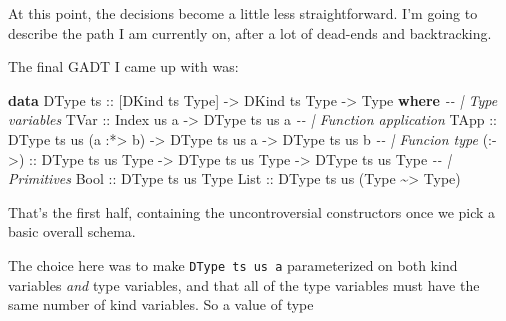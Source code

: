 \documentclass[]{article}
\newenvironment{Shaded}{}{}
\newcommand{\CommentTok}[1]{\textcolor[rgb]{0.38,0.63,0.69}{\textit{#1}}}
\newcommand{\DataTypeTok}[1]{\textcolor[rgb]{0.56,0.13,0.00}{#1}}
\newcommand{\KeywordTok}[1]{\textcolor[rgb]{0.00,0.44,0.13}{\textbf{#1}}}
\newcommand{\NormalTok}[1]{#1}
\newcommand{\OperatorTok}[1]{\textcolor[rgb]{0.40,0.40,0.40}{#1}}
\newcommand{\OtherTok}[1]{\textcolor[rgb]{0.00,0.44,0.13}{#1}}
\begin{document}
At this point, the decisions become a little less straightforward. I'm going to
describe the path I am currently on, after a lot of dead-ends and backtracking.

The final GADT I came up with was:

\begin{Shaded}
\begin{Highlighting}[]
\KeywordTok{data} \DataTypeTok{DType}\OtherTok{ ts ::}\NormalTok{ [}\DataTypeTok{DKind}\NormalTok{ ts }\DataTypeTok{\textquotesingle{}Type}\NormalTok{] }\OtherTok{{-}\textgreater{}} \DataTypeTok{DKind}\NormalTok{ ts }\DataTypeTok{\textquotesingle{}Type} \OtherTok{{-}\textgreater{}} \DataTypeTok{Type} \KeywordTok{where}
    \CommentTok{{-}{-} | Type variables}
    \DataTypeTok{TVar}\OtherTok{  ::} \DataTypeTok{Index}\NormalTok{ us a }\OtherTok{{-}\textgreater{}} \DataTypeTok{DType}\NormalTok{ ts us a}
    \CommentTok{{-}{-} | Function application}
    \DataTypeTok{TApp}\OtherTok{  ::} \DataTypeTok{DType}\NormalTok{ ts us (a \textquotesingle{}}\OperatorTok{:*\textgreater{}}\NormalTok{ b) }\OtherTok{{-}\textgreater{}} \DataTypeTok{DType}\NormalTok{ ts us a }\OtherTok{{-}\textgreater{}} \DataTypeTok{DType}\NormalTok{ ts us b}
    \CommentTok{{-}{-} | Funcion type}
\OtherTok{    (:{-}\textgreater{}) ::} \DataTypeTok{DType}\NormalTok{ ts us }\DataTypeTok{\textquotesingle{}Type} \OtherTok{{-}\textgreater{}} \DataTypeTok{DType}\NormalTok{ ts us }\DataTypeTok{\textquotesingle{}Type} \OtherTok{{-}\textgreater{}} \DataTypeTok{DType}\NormalTok{ ts us }\DataTypeTok{\textquotesingle{}Type}
    \CommentTok{{-}{-} | Primitives}
    \DataTypeTok{Bool}\OtherTok{  ::} \DataTypeTok{DType}\NormalTok{ ts us }\DataTypeTok{\textquotesingle{}Type}
    \DataTypeTok{List}\OtherTok{  ::} \DataTypeTok{DType}\NormalTok{ ts us (}\DataTypeTok{\textquotesingle{}Type}\NormalTok{ \textquotesingle{}}\OperatorTok{\textasciitilde{}\textgreater{}} \DataTypeTok{\textquotesingle{}Type}\NormalTok{)}
\end{Highlighting}
\end{Shaded}

That's the first half, containing the uncontroversial constructors once we pick
a basic overall schema.

The choice here was to make \texttt{DType\ ts\ us\ a} parameterized on both kind
variables \emph{and} type variables, and that all of the type variables must
have the same number of kind variables. So a value of type
\end{document}

